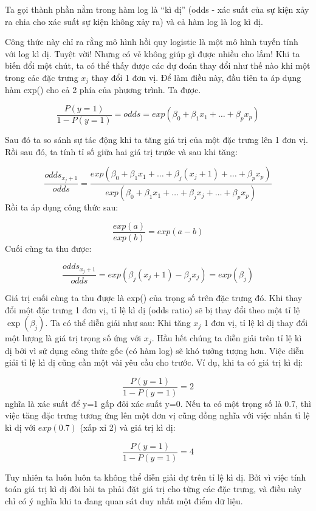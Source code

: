 Ta gọi thành phần nằm trong hàm log là ``kì dị'' (odds - xác suất của sự kiện xảy ra chia cho xác suất sự kiện không xảy ra) và cả hàm log là log kì dị.

Công thức này chỉ ra rằng mô hình hồi quy logistic là một mô hình tuyến tính với log kì dị. Tuyệt vời! Nhưng có vẻ không giúp gì được nhiều cho lắm! Khi ta biến đổi một chút, ta có thể thấy được các dự đoán thay đổi như thế nào khi một trong các đặc trưng $x_j$ thay đổi 1 đơn vị. Để làm điều này, đầu tiên ta áp dụng hàm exp() cho cả 2 phía của phương trình. Ta được.

$$\frac{P(y=1)}{1-P(y=1)}=odds=exp\left(\beta_{0}+\beta_{1}x_{1}+\ldots+\beta_{p}x_{p}\right)$$

Sau đó ta so sánh sự tác động khi ta tăng giá trị của một đặc trưng lên 1 đơn vị. Rồi sau đó, ta tính tỉ số giữa hai giá trị trước và sau khi tăng:

$$\frac{odds_{x_j+1}}{odds}=\frac{exp\left(\beta_{0}+\beta_{1}x_{1}+\ldots+\beta_{j}(x_{j}+1)+\ldots+\beta_{p}x_{p}\right)}{exp\left(\beta_{0}+\beta_{1}x_{1}+\ldots+\beta_{j}x_{j}+\ldots+\beta_{p}x_{p}\right)}$$
Rồi ta áp dụng công thức sau:

$$\frac{exp(a)}{exp(b)}=exp(a-b)$$
Cuối cùng ta thu được:

$$\frac{odds_{x_j+1}}{odds}=exp\left(\beta_{j}(x_{j}+1)-\beta_{j}x_{j}\right)=exp\left(\beta_j\right)$$

Giá trị cuối cùng ta thu được là exp() của trọng số trên đặc trưng đó. Khi thay đổi một đặc trưng 1 đơn vị, tỉ lệ kì dị (odds ratio) sẽ bị thay đổi theo một tỉ lệ $\exp(\beta_j)$. Ta có thể diễn giải như sau: Khi tăng $x_j$ 1 đơn vị, tỉ lệ kì dị thay đổi một lượng là giá trị trọng số ứng với $x_j$. Hầu hết chúng ta diễn giải trên tỉ lệ kì dị bởi vì sử dụng công thức gốc (có hàm log) sẽ khó tưởng tượng hơn. Việc diễn giải tỉ lệ kì dị cũng cần một vài yêu cầu cho trước. Ví dụ, khi ta có  giá trị kì dị:

$$\frac{P(y=1)}{1-P(y=1)}=2$$
nghĩa là xác suất để y=1 gấp đôi xác suất y=0. Nếu ta có một trọng số là 0.7, thì việc tăng đặc trưng tương ứng lên một đơn vị cũng đồng nghĩa với việc nhân tỉ lệ kì dị với $exp(0.7)$ (xấp xỉ 2) và giá trị kì dị:

$$\frac{P(y=1)}{1-P(y=1)}=4$$

Tuy nhiên ta luôn luôn ta không thể diễn giải dự trên tỉ lệ kì dị. Bởi vì việc tính toán giá trị kì dị đòi hỏi ta phải đặt giá trị cho từng các đặc trưng, và điều này chỉ có ý nghĩa khi ta đang quan sát duy nhất một điểm dữ liệu.

